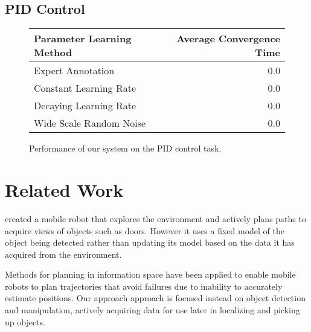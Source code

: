 \documentclass[conference]{IEEEtran}
\begin{document}
\subsection{PID Control}

\begin{figure}
  \begin{center}
  \begin{tabular}{|l|r|}
  \hline
  Parameter Learning Method & Average Convergence Time \\ \hline
  Expert Annotation & 0.0 \\ \hline
  Constant Learning Rate & 0.0 \\ \hline
  Decaying Learning Rate & 0.0 \\ \hline
  Wide Scale Random Noise & 0.0 \\ \hline
  \end{tabular}
  \caption{Performance of our system on the PID control task.}
  \end{center}
\end{figure}




\section{Related Work}

\citet{velez11} created a mobile robot that explores the environment
and actively plans paths to acquire views of objects such as doors.
However it uses a fixed model of the object being detected rather than
updating its model based on the data it has acquired from the
environment.

Methods for planning in information space \citep{he08, atanasov13,
  prentice09} have been applied to enable mobile robots to plan
trajectories that avoid failures due to inability to accurately
estimate positions.  Our approach approach is focused instead on
object detection and manipulation, actively acquiring data for use
later in localizing and picking up objects.
\end{document}
